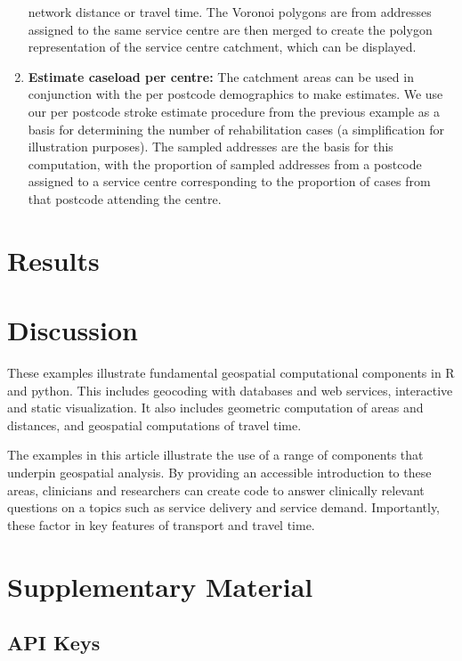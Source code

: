 \documentclass[utf8]{frontiersHLTH}
\begin{document}
\begin{enumerate}
  network distance or travel time. The Voronoi polygons are from
  addresses assigned to the same service centre are then merged to
  create the polygon representation of the service centre catchment,
  which can be displayed.
\item
  {\bf Estimate caseload per centre:} The catchment areas can be used in
  conjunction with the per postcode demographics to make estimates. We
  use our per postcode stroke estimate procedure from the previous
  example as a basis for determining the number of rehabilitation cases
  (a simplification for illustration purposes). The sampled addresses
  are the basis for this computation, with the proportion of sampled
  addresses from a postcode assigned to a service centre corresponding
  to the proportion of cases from that postcode attending the centre.
\end{enumerate}

\section{Results}


\section{Discussion}\label{discussion}

These examples illustrate fundamental geospatial computational
components in R and python. This includes geocoding with databases and
web services, interactive and static visualization. It also includes
geometric computation of areas and distances, and geospatial
computations of travel time.

The examples in this article illustrate the use of a range of components
that underpin geospatial analysis. By providing an accessible
introduction to these areas, clinicians and researchers can create code
to answer clinically relevant questions on a topics such as service
delivery and service demand. Importantly, these factor in key features
of transport and travel time.

\section{Supplementary Material}\label{supplementary-material}

\subsection{API Keys}\label{api-keys}
\end{document}
